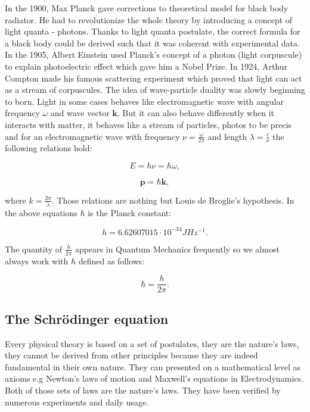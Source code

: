 \documentclass[a4paper,oneside,openright,11pt]{book}
\begin{document}
In the 1900, Max Planck gave corrections to theoretical model for black body radiator. He had to revolutionize the whole theory by introducing a concept of light quanta - photons. Thanks to light quanta postulate, the correct formula for a black body could be derived such that it was coherent with experimental data. In the 1905, Albert Einstein used Planck's concept of a photon (light corpuscule) to explain photoelectric effect which gave him a Nobel Prize. In 1924, Arthur Compton made his famous scattering experiment which proved that light can act as a stream of corpuscules. The idea of wave-particle duality was slowly beginning to born. Light in some cases behaves like electromagnetic wave with angular frequency $\omega$ and wave vector $\textbf{k}$. But it can also behave differently when it interacts with matter, it behaves like a stream of particles, photos to be precis and for an electromagnetic wave with frequency $\nu = \frac{\omega}{2 \pi}$ and length $\lambda = \frac{c}{\nu}$ the following relations hold:

\begin{equation}
    E = h \nu = \hbar \omega,
\end{equation}

\begin{equation}
    \textbf{p} = \hbar \textbf{k},
\end{equation}

where $k = \frac{2 \pi}{\lambda}$. Those relations are nothing but Louis de Broglie's hypothesis.\cite{kryszewski} In the above equations $\hbar$ is the Planck constant:

\begin{equation*}
    h =  6.62607015 \cdot 10^{-34} J Hz^{-1}.
\end{equation*}

The quantity of $\frac{h}{2 \pi}$ appears in Quantum Mechanics frequently so we almost always work with $\hbar$ defined as follows:

\begin{equation*}
    \hbar = \frac{h}{2 \pi}.
\end{equation*}


\subsection{The Schrödinger equation}

Every physical theory is based on a set of postulates, they are the nature's laws, they cannot be derived from other principles because they are indeed fundamental in their own nature. They can presented on a mathematical level as axioms e.g Newton's laws of motion and Maxwell's equations in Electrodynamics. Both of those sets of laws are the nature's laws. They have been verified by numerous experiments and daily usage.
\end{document}
